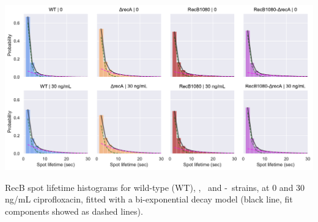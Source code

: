 \begin{suppfigure*}[htbp]
    \begin{center}
    \includegraphics[width=.8\textwidth]{SI_Figures/Mutants_RecB_fits.pdf}
    \end{center}
    \caption{RecB spot lifetime histograms for wild-type (WT), \dreca, \teneighty\ and \teneighty -\dreca\ strains, at 0 and 30 ng/mL ciprofloxacin, fitted with a bi-exponential decay model (black line, fit components showed as dashed lines).}
    \label{SIFig:mutants_biexp_fits}
\end{suppfigure*}
